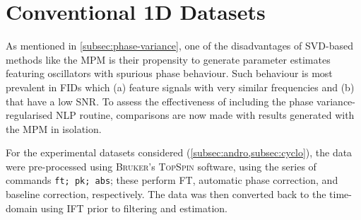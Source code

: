 \section{Conventional \ac{1D} Datasets}
\label{sec:evaluation}

As mentioned in \cref{subsec:phase-variance}, one of the disadvantages of
\ac{SVD}-based methods like the \ac{MPM} is their propensity to generate
parameter estimates featuring oscillators with spurious phase behaviour. Such
behaviour is most prevalent in \acp{FID} which (a) feature signals with very
similar frequencies and (b) that have a low \ac{SNR}.
To assess the effectiveness of including the phase variance-regularised
\ac{NLP} routine, comparisons are now made with results generated with the
\ac{MPM} in isolation.

For the experimental datasets considered (\cref{subsec:andro,subsec:cyclo}),
the data were pre-processed using \textsc{Bruker}'s \textsc{TopSpin} software,
using the series of commands \texttt{ft; pk; abs}; these perform \ac{FT},
automatic phase correction, and baseline correction, respectively. The data was
then converted back to the time-domain using \ac{IFT} prior to filtering and
estimation.


